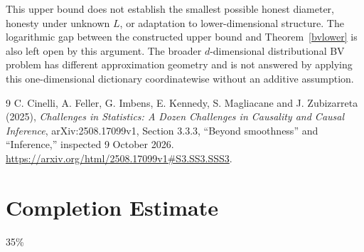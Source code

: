 \documentclass[11pt]{article}
\theoremstyle{remark}
\begin{document}
This upper bound does not establish the smallest possible honest diameter, honesty under unknown $L$, or adaptation to lower-dimensional structure. The logarithmic gap between the constructed upper bound and Theorem~\ref{bvlower} is also left open by this argument. The broader $d$-dimensional distributional BV problem has different approximation geometry and is not answered by applying this one-dimensional dictionary coordinatewise without an additive assumption.

\begin{thebibliography}{9}
 C. Cinelli, A. Feller, G. Imbens, E. Kennedy, S. Magliacane and J. Zubizarreta (2025), \emph{Challenges in Statistics: A Dozen Challenges in Causality and Causal Inference}, arXiv:2508.17099v1, Section 3.3.3, ``Beyond smoothness'' and ``Inference,'' inspected 9 October 2026. \url{https://arxiv.org/html/2508.17099v1#S3.SS3.SSS3}.
\end{thebibliography}

\section{Completion Estimate}
35\%
\end{document}
